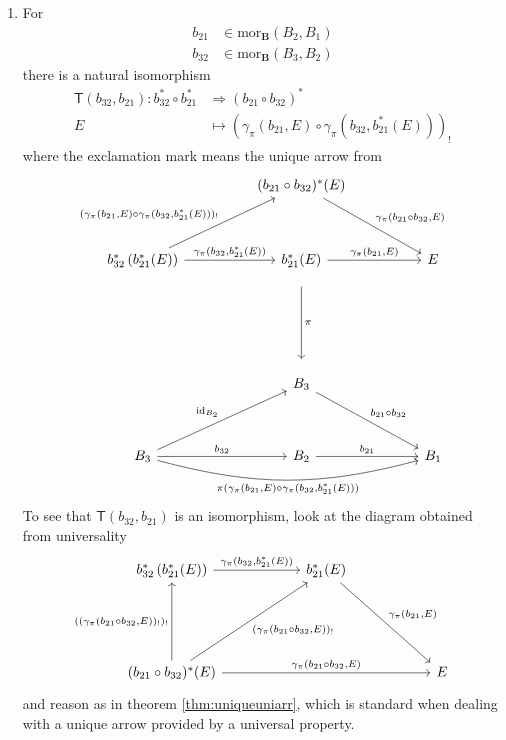 \begin{enumerate}
\item[($\psi$)]
For
\begin{align*}
  b_{21}
  &\in
  \mathrm{mor}_{\mathbf{B}}(B_{2},B_{1})
  \\
  b_{32}
  &\in
  \mathrm{mor}_{\mathbf{B}}(B_{3},B_{2})
\end{align*}
there is a natural isomorphism
\begin{align*}
  \mathsf{T}(b_{32},b_{21})
  \colon
  b_{32}^{\ast}
  \circ
  b_{21}^{\ast}
  &\Rightarrow
  \left(
    b_{21}
    \circ
    b_{32}
  \right)^{\ast}
  \\
  E
  &\mapsto
  \left(
    \gamma_{\pi}(b_{21},E)
    \circ
    \gamma_{\pi}(b_{32},b_{21}^{\ast}(E))
  \right)_{!}
\end{align*}
where the exclamation mark means the unique arrow from
\[
\begin{tikzcd}[sep=huge]
  &
  (b_{21} \circ b_{32})^{\ast}(E)
  \arrow{dr}{\gamma_{\pi}(b_{21} \circ b_{32},E)}
  &
  \\
  b_{32}^{\ast}
  \left(
    b_{21}^{\ast}(E)
  \right)
  \arrow{ur}{(\gamma_{\pi}(b_{21},E) \circ \gamma_{\pi}(b_{32},b_{21}^{\ast}(E)))_{!}}
  \arrow{r}{\gamma_{\pi}(b_{32},b_{21}^{\ast}(E))}
  &
  b_{21}^{\ast}(E)
  \arrow{r}{\gamma_{\pi}(b_{21},E)}
  \arrow[shorten <= 10pt, shorten >= 10pt]{dd}{\pi}
  &
  E
  \\
  &
  &
  \\
  &
  B_{3}
  \arrow{dr}{b_{21} \circ b_{32}}
  &
  \\
  B_{3}
  \arrow{ur}{\mathrm{id}_{B_{2}}}
  \arrow{r}{b_{32}}
  \arrow[swap,bend right=15]{rr}{\pi(\gamma_{\pi}(b_{21},E) \circ \gamma_{\pi}(b_{32},b_{21}^{\ast}(E)))}
  &
  B_{2}
  \arrow{r}{b_{21}}
  &
  B_{1}
\end{tikzcd}
\]
To see that $\mathsf{T}(b_{32},b_{21})$ is an isomorphism, look at the diagram obtained from universality
\[
\begin{tikzcd}[row sep=13ex,column sep=13ex]
  b_{32}^{\ast}
  \left(
    b_{21}^{\ast}(E)
  \right)
  \arrow{r}{\gamma_{\pi}(b_{32},b_{21}^{\ast}(E))}
  &
  b_{21}^{\ast}(E)
  \arrow{dr}{\gamma_{\pi}(b_{21},E)}
  &
  \\
  (b_{21} \circ b_{32})^{\ast}(E)
  \arrow{u}{((\gamma_{\pi}(b_{21} \circ b_{32},E))_{!})_{!}}
  \arrow[swap]{ur}{(\gamma_{\pi}(b_{21} \circ b_{32},E))_{!}}
  \arrow{rr}{\gamma_{\pi}(b_{21} \circ b_{32},E)}
  &
  &
  E
\end{tikzcd}
\]
and reason as in theorem \ref{thm:uniqueuniarr}, which is standard when dealing with a unique arrow provided by a universal property.

\end{enumerate}
